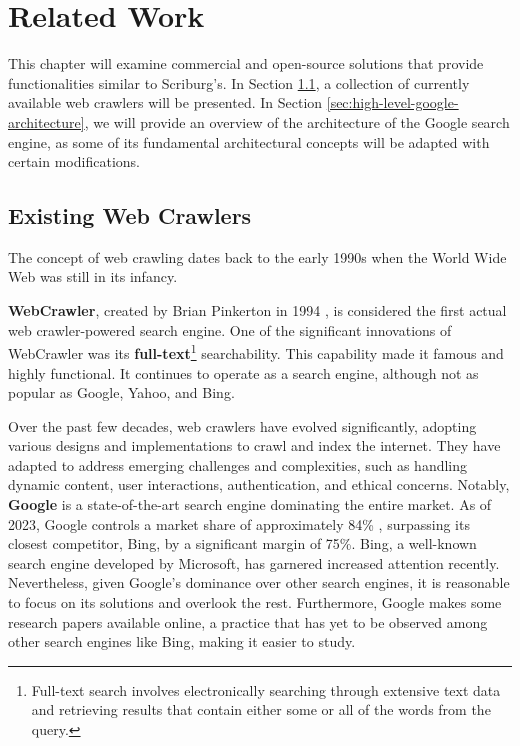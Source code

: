 \chapter{Related Work}
\label{chap:relatedwork}

This chapter will examine commercial and open-source solutions that provide functionalities similar to Scriburg's. In Section \ref{sec:existing-web-crawlers}, a collection of currently available web crawlers will be presented. In Section \ref{sec:high-level-google-architecture}, we will provide an overview of the architecture of the Google search engine, as some of its fundamental architectural concepts will be adapted with certain modifications.

\section{Existing Web Crawlers}\label{sec:existing-web-crawlers}
The concept of web crawling dates back to the early 1990s when the World Wide Web was still in its infancy.

\textbf{WebCrawler}, created by Brian Pinkerton in 1994 \cite{pinkerton2000webcrawler}, is considered the first actual web crawler-powered search engine. One of the significant innovations of WebCrawler was its \textbf{full-text}\footnote{Full-text search involves electronically searching through extensive text data and retrieving results that contain either some or all of the words from the query.} searchability. This capability made it famous and highly functional. It continues to operate as a search engine, although not as popular as Google, Yahoo, and Bing.

Over the past few decades, web crawlers have evolved significantly, adopting various designs and implementations to crawl and index the internet. They have adapted to address emerging challenges and complexities, such as handling dynamic content, user interactions, authentication, and ethical concerns. Notably, \textbf{Google} is a state-of-the-art search engine dominating the entire market. As of 2023, Google controls a market share of approximately 84\% \cite{statista}, surpassing its closest competitor, Bing, by a significant margin of 75\%. Bing, a well-known search engine developed by Microsoft, has garnered increased attention recently. Nevertheless, given Google's dominance over other search engines, it is reasonable to focus on its solutions and overlook the rest. Furthermore, Google makes some research papers available online, a practice that has yet to be observed among other search engines like Bing, making it easier to study.


